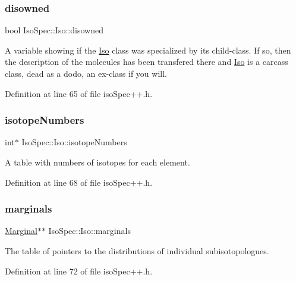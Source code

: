 \subsubsection{\texorpdfstring{disowned}{disowned}}
{\footnotesize\ttfamily bool Iso\+Spec\+::\+Iso\+::disowned}

A variable showing if the \mbox{\hyperlink{class_iso_spec_1_1_iso}{Iso}} class was specialized by its child-\/class. If so, then the description of the molecules has been transfered there and \mbox{\hyperlink{class_iso_spec_1_1_iso}{Iso}} is a carcass class, dead as a dodo, an ex-\/class if you will. 

Definition at line 65 of file iso\+Spec++.\+h.

\mbox{\label{class_iso_spec_1_1_iso_a7235f0afc56dccd13937791a630c45da}} 
\subsubsection{\texorpdfstring{isotope\+Numbers}{isotopeNumbers}}
{\footnotesize\ttfamily int$\ast$ Iso\+Spec\+::\+Iso\+::isotope\+Numbers\hspace{0.3cm}{\ttfamily [protected]}}

A table with numbers of isotopes for each element. 

Definition at line 68 of file iso\+Spec++.\+h.

\mbox{\label{class_iso_spec_1_1_iso_aea98a8331a2f8a1a6bbcace6124fcfae}} 
\subsubsection{\texorpdfstring{marginals}{marginals}}
{\footnotesize\ttfamily \mbox{\hyperlink{class_iso_spec_1_1_marginal}{Marginal}}$\ast$$\ast$ Iso\+Spec\+::\+Iso\+::marginals\hspace{0.3cm}{\ttfamily [protected]}}

The table of pointers to the distributions of individual subisotopologues. 

Definition at line 72 of file iso\+Spec++.\+h.

